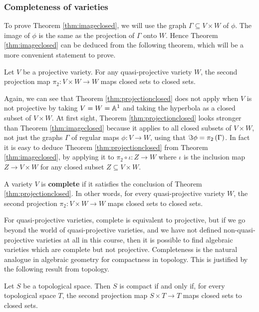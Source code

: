 \subsubsection{Completeness of varieties}

To prove Theorem \ref{thm:imageclosed}, we will use the graph $ \Gamma \subseteq V \times W $ of $ \phi $. The image of $ \phi $ is the same as the projection of $ \Gamma $ onto $ W $. Hence Theorem \ref{thm:imageclosed} can be deduced from the following theorem, which will be a more convenient statement to prove.

\begin{theorem}
\label{thm:projectionclosed}
Let $ V $ be a projective variety. For any quasi-projective variety $ W $, the second projection map $ \pi_2 : V \times W \to W $ maps closed sets to closed sets.
\end{theorem}

Again, we can see that Theorem \ref{thm:projectionclosed} does not apply when $ V $ is not projective by taking $ V = W = \AA^1 $ and taking the hyperbola as a closed subset of $ V \times W $. At first sight, Theorem \ref{thm:projectionclosed} looks stronger than Theorem \ref{thm:imageclosed} because it applies to all closed subsets of $ V \times W $, not just the graphs $ \Gamma $ of regular maps $ \phi : V \to W $, using that $ \Im \phi = \pi_2\br{\Gamma} $. In fact it is easy to deduce Theorem \ref{thm:projectionclosed} from Theorem \ref{thm:imageclosed}, by applying it to $ \pi_2 \circ \iota : Z \to W $ where $ \iota $ is the inclusion map $ Z \to V \times W $ for any closed subset $ Z \subseteq V \times W $.

\begin{definition*}
A variety $ V $ is \textbf{complete} if it satisfies the conclusion of Theorem \ref{thm:projectionclosed}. In other words, for every quasi-projective variety $ W $, the second projection $ \pi_2 : V \times W \to W $ maps closed sets to closed sets.
\end{definition*}

For quasi-projective varieties, complete is equivalent to projective, but if we go beyond the world of quasi-projective varieties, and we have not defined non-quasi-projective varieties at all in this course, then it is possible to find algebraic varieties which are complete but not projective. Completeness is the natural analogue in algebraic geometry for compactness in topology. This is justified by the following result from topology.

\begin{lemma}
\label{lem:projectionclosed}
Let $ S $ be a topological space. Then $ S $ is compact if and only if, for every topological space $ T $, the second projection map $ S \times T \to T $ maps closed sets to closed sets.
\end{lemma}

